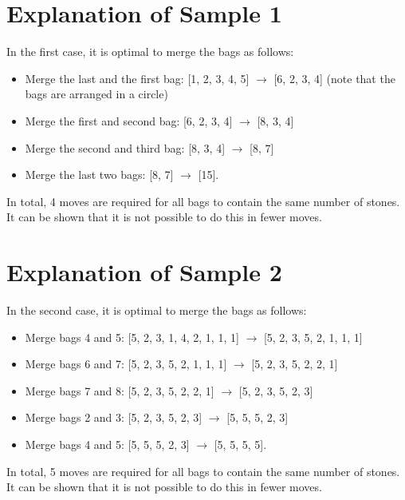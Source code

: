 \section*{Explanation of Sample 1}
In the first case, it is optimal to merge the bags as follows:
\begin{itemize}
    \item Merge the last and the first bag: [1, 2, 3, 4, 5] $\to$ [6, 2, 3, 4] (note that the bags are arranged in a circle)
    \item Merge the first and second bag: [6, 2, 3, 4] $\to$ [8, 3, 4]
    \item Merge the second and third bag: [8, 3, 4] $\to$ [8, 7]
    \item Merge the last two bags: [8, 7] $\to$ [15].
\end{itemize}

In total, 4 moves are required for all bags to contain the same number of stones. It can be shown that it is not possible to do this in fewer moves.


\section*{Explanation of Sample 2}
In the second case, it is optimal to merge the bags as follows:
\begin{itemize}
    \item Merge bags 4 and 5: [5, 2, 3, 1, 4, 2, 1, 1, 1] $\to$ [5, 2, 3, 5, 2, 1, 1, 1]
    \item Merge bags 6 and 7: [5, 2, 3, 5, 2, 1, 1, 1] $\to$ [5, 2, 3, 5, 2, 2, 1]
    \item Merge bags 7 and 8: [5, 2, 3, 5, 2, 2, 1] $\to$ [5, 2, 3, 5, 2, 3]
    \item Merge bags 2 and 3: [5, 2, 3, 5, 2, 3] $\to$ [5, 5, 5, 2, 3]
    \item Merge bags 4 and 5: [5, 5, 5, 2, 3] $\to$ [5, 5, 5, 5].
\end{itemize}

In total, 5 moves are required for all bags to contain the same number of stones. It can be shown that it is not possible to do this in fewer moves.

